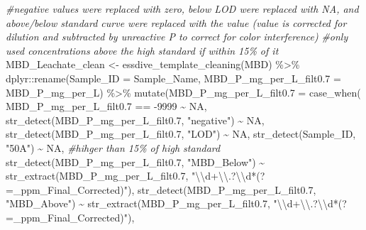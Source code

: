 \documentclass[
]{article}
\newenvironment{Shaded}{\begin{snugshade}}{\end{snugshade}}
\newcommand{\AttributeTok}[1]{\textcolor[rgb]{0.77,0.63,0.00}{#1}}
\newcommand{\CommentTok}[1]{\textcolor[rgb]{0.56,0.35,0.01}{\textit{#1}}}
\newcommand{\ConstantTok}[1]{\textcolor[rgb]{0.00,0.00,0.00}{#1}}
\newcommand{\DecValTok}[1]{\textcolor[rgb]{0.00,0.00,0.81}{#1}}
\newcommand{\FloatTok}[1]{\textcolor[rgb]{0.00,0.00,0.81}{#1}}
\newcommand{\FunctionTok}[1]{\textcolor[rgb]{0.00,0.00,0.00}{#1}}
\newcommand{\NormalTok}[1]{#1}
\newcommand{\OtherTok}[1]{\textcolor[rgb]{0.56,0.35,0.01}{#1}}
\newcommand{\SpecialCharTok}[1]{\textcolor[rgb]{0.00,0.00,0.00}{#1}}
\newcommand{\StringTok}[1]{\textcolor[rgb]{0.31,0.60,0.02}{#1}}
\begin{document}
\begin{Shaded}
\begin{Highlighting}[]
\CommentTok{\#negative values were replaced with zero, below LOD were replaced with NA, and above/below standard curve were replaced with the value (value is corrected for dilution and subtracted by unreactive P to correct for color interference)}
\CommentTok{\#only used concentrations above the high standard if within 15\% of it}
\NormalTok{MBD\_Leachate\_clean }\OtherTok{\textless{}{-}} \FunctionTok{essdive\_template\_cleaning}\NormalTok{(MBD) }\SpecialCharTok{\%\textgreater{}\%}
\NormalTok{  dplyr}\SpecialCharTok{::}\FunctionTok{rename}\NormalTok{(}\AttributeTok{Sample\_ID =} \StringTok{\textquotesingle{}Sample\_Name\textquotesingle{}}\NormalTok{,}
                \AttributeTok{MBD\_P\_mg\_per\_L\_filt0.7 =} \StringTok{\textquotesingle{}MBD\_P\_mg\_per\_L\textquotesingle{}}\NormalTok{) }\SpecialCharTok{\%\textgreater{}\%}
  \FunctionTok{mutate}\NormalTok{(}\AttributeTok{MBD\_P\_mg\_per\_L\_filt0.7 =} \FunctionTok{case\_when}\NormalTok{(}
\NormalTok{                MBD\_P\_mg\_per\_L\_filt0}\FloatTok{.7} \SpecialCharTok{==} \SpecialCharTok{{-}}\DecValTok{9999} \SpecialCharTok{\textasciitilde{}} \ConstantTok{NA}\NormalTok{,}
                \FunctionTok{str\_detect}\NormalTok{(MBD\_P\_mg\_per\_L\_filt0}\FloatTok{.7}\NormalTok{, }\StringTok{"negative"}\NormalTok{) }\SpecialCharTok{\textasciitilde{}} \ConstantTok{NA}\NormalTok{, }
                \FunctionTok{str\_detect}\NormalTok{(MBD\_P\_mg\_per\_L\_filt0}\FloatTok{.7}\NormalTok{, }\StringTok{"LOD"}\NormalTok{) }\SpecialCharTok{\textasciitilde{}} \ConstantTok{NA}\NormalTok{, }
                \FunctionTok{str\_detect}\NormalTok{(Sample\_ID, }\StringTok{"50A"}\NormalTok{) }\SpecialCharTok{\textasciitilde{}} \ConstantTok{NA}\NormalTok{, }\CommentTok{\#hihger than 15\% of high standard}
                \FunctionTok{str\_detect}\NormalTok{(MBD\_P\_mg\_per\_L\_filt0}\FloatTok{.7}\NormalTok{, }\StringTok{"MBD\_Below"}\NormalTok{) }\SpecialCharTok{\textasciitilde{}} 
                \FunctionTok{str\_extract}\NormalTok{(MBD\_P\_mg\_per\_L\_filt0}\FloatTok{.7}\NormalTok{, }\StringTok{"}\SpecialCharTok{\textbackslash{}\textbackslash{}}\StringTok{d+}\SpecialCharTok{\textbackslash{}\textbackslash{}}\StringTok{.?}\SpecialCharTok{\textbackslash{}\textbackslash{}}\StringTok{d*(?=\_ppm\_Final\_Corrected)"}\NormalTok{),}
                \FunctionTok{str\_detect}\NormalTok{(MBD\_P\_mg\_per\_L\_filt0}\FloatTok{.7}\NormalTok{, }\StringTok{"MBD\_Above"}\NormalTok{) }\SpecialCharTok{\textasciitilde{}} 
                \FunctionTok{str\_extract}\NormalTok{(MBD\_P\_mg\_per\_L\_filt0}\FloatTok{.7}\NormalTok{, }\StringTok{"}\SpecialCharTok{\textbackslash{}\textbackslash{}}\StringTok{d+}\SpecialCharTok{\textbackslash{}\textbackslash{}}\StringTok{.?}\SpecialCharTok{\textbackslash{}\textbackslash{}}\StringTok{d*(?=\_ppm\_Final\_Corrected)"}\NormalTok{),}

\end{Highlighting}
\end{Shaded}
\end{document}
